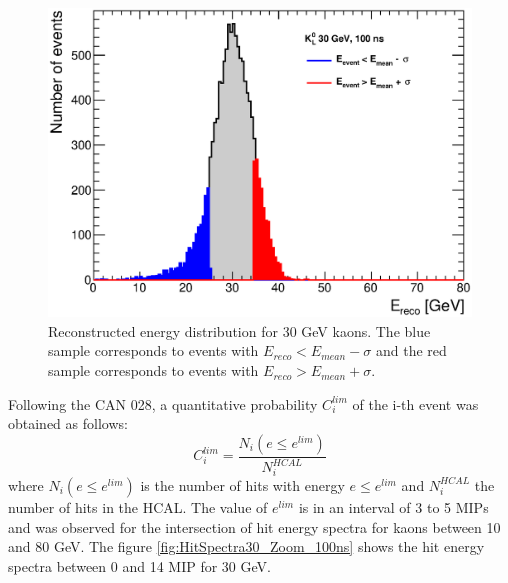 \begin{figure}[htbp!]
  \centering
  \includegraphics[width=0.6\linewidth]{../Thesis_Plots/ILD/AdditionalPlots/Plots/EnergySum_100ns_30GeV.eps}
  \caption{Reconstructed energy distribution for 30 GeV kaons. The blue sample corresponds to events with $E_{reco} < E_{mean} - \sigma$ and the red sample corresponds to events with $E_{reco} > E_{mean} + \sigma$.} \label{fig:Esum30_100ns}
\end{figure}

Following the CAN 028, a quantitative probability $C_{i}^{lim}$ of the i-th event was obtained as follows:
\begin{equation}
  C_{i}^{lim} = \frac{N_{i}(e \leq e^{lim})}{N_{i}^{HCAL}}
\end{equation}
where $N_{i}(e \leq e^{lim})$ is the number of hits with energy $e \leq e^{lim}$ and $N_{i}^{HCAL}$ the number of hits in the HCAL. The value of $e^{lim}$ is in an interval of 3 to 5 MIPs and was observed for the intersection of hit energy spectra for kaons between 10 and 80 GeV. The figure \ref{fig:HitSpectra30_Zoom_100ns} shows the hit energy spectra between 0 and 14 MIP for 30 GeV.

